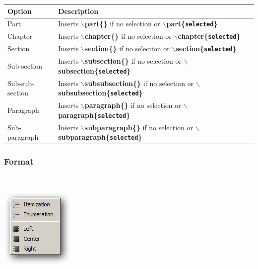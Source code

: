 \begin{scriptsize}\begin{tabularx}{\textwidth}{>{\hsize=0.2\hsize}X>{\hsize=0.8\hsize}X}\\
    \hline
    \textbf{Option} & \textbf{Description} \\
    \hline
    Part & Inserts \textbf{$\backslash$part\{\}} if no selection or \textbf{$\backslash$part\{\texttt{selected}\}} \\
    Chapter & Inserts \textbf{$\backslash$chapter\{\}} if no selection or \textbf{$\backslash$chapter\{\texttt{selected}\}} \\
    Section & Inserts \textbf{$\backslash$section\{\}} if no selection or \textbf{$\backslash$section\{\texttt{selected}\}} \\
    Sub-section & Inserts \textbf{$\backslash$subsection\{\}} if no selection or \textbf{$\backslash$subsection\{\texttt{selected}\}} \\
    Sub-sub-section & Inserts \textbf{$\backslash$subsubsection\{\}} if no selection or \textbf{$\backslash$subsubsection\{\texttt{selected}\}} \\
    Paragraph & Inserts \textbf{$\backslash$paragraph\{\}} if no selection or \textbf{$\backslash$paragraph\{\texttt{selected}\}} \\
    Sub-paragraph & Inserts \textbf{$\backslash$subparagraph\{\}} if no selection or \textbf{$\backslash$subparagraph\{\texttt{selected}\}} \\
    \hline
  \end{tabularx}\end{scriptsize}


\hypertarget{menu_insert_latex_format}{}
\subsubsection{Format}\\

\includegraphics[scale=0.50]{./res/menu_insert_latex_format.png}\\

